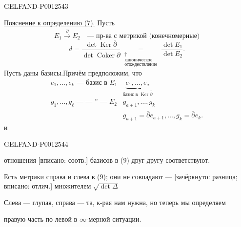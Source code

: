 \begin{GelfandAdjacentEvidence}{GELFAND-P001254}{3}


\underline{Пояснение к определению (7).} Пусть
\begin{equation*}
E_1\xrightarrow{\bar\partial}E_2
\quad\text{— пр-ва с метрикой (конечномерные)}\tag{8}
\end{equation*}
\begin{equation*}
d=\frac{\det\operatorname{Ker}\bar\partial}{\det\operatorname{Coker}\bar\partial}
\underset{\substack{\uparrow\\\text{каноническое}\\\text{отождествление}}}{=}
\frac{\det E_1}{\det E_2}.\tag{9}
\end{equation*}
Пусть даны базисы.\qquad Причём предположим, что
\begin{equation*}
\begin{array}{l|l}
e_1,\ldots,e_k\text{ — базис в }E_1&
\underbrace{e_1,\ldots,e_a}_{\text{базис в }\operatorname{Ker}\bar\partial}\\[2pt]
g_1,\ldots,g_{\ell}\text{ — — '' — }E_2&g_{a+1},\ldots,g_k\\
&g_{a+1}=\bar\partial e_{a+1},\ldots,g_k=\bar\partial e_k.
\end{array}\tag{10}
\end{equation*}
и
\end{GelfandAdjacentEvidence}
\begin{GelfandAdjacentEvidence}{GELFAND-P001254}{4}

отношения [вписано: соотв.] базисов в (9) друг другу соответствуют.

Есть метрики справа и слева в (9); они не совпадают — [зачёркнуто: разница; вписано: отлич.] множителем $\sqrt{\det\Delta}$

Слева — глупая, справа — та, к-рая нам нужна, но теперь мы определяем
\end{GelfandAdjacentEvidence}

правую часть по левой в $\infty$-мерной ситуации.


